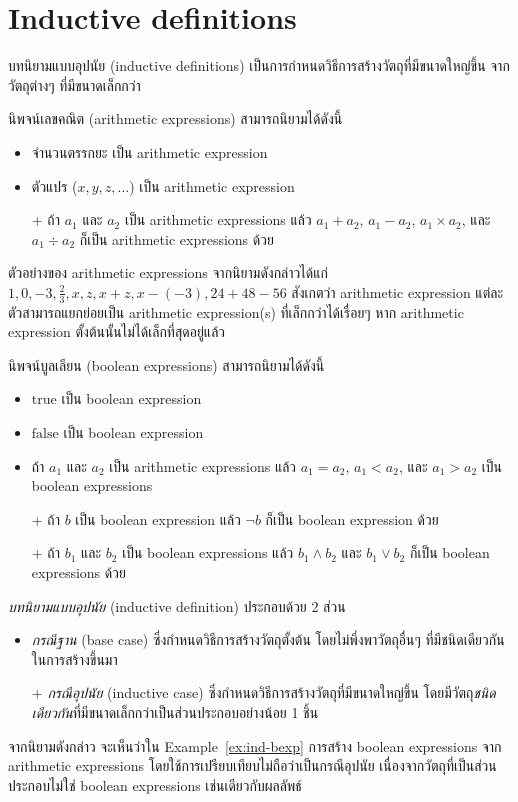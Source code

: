 \section{Inductive definitions}

บทนิยามแบบอุปนัย (inductive definitions) เป็นการกำหนดวิธีการสร้างวัตถุที่มีขนาดใหญ่ขึ้น จากวัตถุต่างๆ ที่มีขนาดเล็กกว่า

\begin{example}
นิพจน์เลขคณิต (arithmetic expressions) สามารถนิยามได้ดังนี้
\begin{itemize}
\item จำนวนตรรกยะ เป็น arithmetic expression
\item ตัวแปร ($x,y,z,\ldots$) เป็น arithmetic expression
\item[+] ถ้า $a_1$ และ $a_2$ เป็น arithmetic expressions แล้ว $a_1+a_2$, $a_1-a_2$, $a_1\times a_2$, และ $a_1\div a_2$ ก็เป็น arithmetic expressions ด้วย
\end{itemize}
ตัวอย่างของ arithmetic expressions จากนิยามดังกล่าวได้แก่ $1,0,-3,\frac{2}{3},x,z,x+z,x-(-3),24+48-56$ สังเกตว่า arithmetic expression แต่ละตัวสามารถแยกย่อยเป็น arithmetic expression(s) ที่เล็กกว่าได้เรื่อยๆ หาก arithmetic expression ตั้งต้นนั้นไม่ได้เล็กที่สุดอยู่แล้ว
\end{example}

\begin{example}\label{ex:ind-bexp}
นิพจน์บูลเลียน (boolean expressions) สามารถนิยามได้ดังนี้
\begin{itemize}
\item $\mathrm{true}$ เป็น boolean expression
\item $\mathrm{false}$ เป็น boolean expression
\item ถ้า $a_1$ และ $a_2$ เป็น arithmetic expressions แล้ว $a_1=a_2$, $a_1<a_2$, และ $a_1>a_2$ เป็น boolean expressions
\item[+] ถ้า $b$ เป็น boolean expression แล้ว $\neg b$ ก็เป็น boolean expression ด้วย
\item[+] ถ้า $b_1$ และ $b_2$ เป็น boolean expressions แล้ว $b_1\wedge b_2$ และ $b_1\vee b_2$ ก็เป็น boolean expressions ด้วย
\end{itemize}
\end{example}

\begin{definition}
\emph{บทนิยามแบบอุปนัย} (inductive definition) ประกอบด้วย 2 ส่วน
\begin{itemize}
\item \emph{กรณีฐาน} (base case) ซึ่งกำหนดวิธีการสร้างวัตถุตั้งต้น โดยไม่พึ่งพาวัตถุอื่นๆ ที่มีชนิดเดียวกันในการสร้างขึ้นมา
\item[+] \emph{กรณีอุปนัย} (inductive case) ซึ่งกำหนดวิธีการสร้างวัตถุที่มีขนาดใหญ่ขึ้น โดยมีวัตถุ\emph{ชนิดเดียวกัน}ที่มีขนาดเล็กกว่าเป็นส่วนประกอบอย่างน้อย 1 ชิ้น
\end{itemize}
\end{definition}
จากนิยามดังกล่าว จะเห็นว่าใน Example~\ref{ex:ind-bexp} การสร้าง boolean expressions จาก arithmetic expressions โดยใช้การเปรียบเทียบไม่ถือว่าเป็นกรณีอุปนัย เนื่องจากวัตถุที่เป็นส่วนประกอบไม่ใช่ boolean expressions เช่นเดียวกับผลลัพธ์

